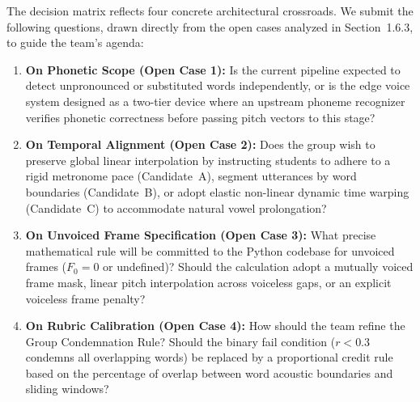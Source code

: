 \documentclass[11pt,a4paper]{article}
\begin{document}
The decision matrix reflects four concrete architectural crossroads. We submit the following questions, drawn directly from the open cases analyzed in Section~1.6.3, to guide the team's agenda:

\begin{enumerate}
    \item \textbf{On Phonetic Scope (Open Case 1):} Is the current pipeline expected to detect unpronounced or substituted words independently, or is the edge voice system designed as a two-tier device where an upstream phoneme recognizer verifies phonetic correctness before passing pitch vectors to this stage?
    \item \textbf{On Temporal Alignment (Open Case 2):} Does the group wish to preserve global linear interpolation by instructing students to adhere to a rigid metronome pace (Candidate~A), segment utterances by word boundaries (Candidate~B), or adopt elastic non-linear dynamic time warping (Candidate~C) to accommodate natural vowel prolongation?
    \item \textbf{On Unvoiced Frame Specification (Open Case 3):} What precise mathematical rule will be committed to the Python codebase for unvoiced frames ($F_0 = 0$ or undefined)? Should the calculation adopt a mutually voiced frame mask, linear pitch interpolation across voiceless gaps, or an explicit voiceless frame penalty?
    \item \textbf{On Rubric Calibration (Open Case 4):} How should the team refine the Group Condemnation Rule? Should the binary fail condition ($r < 0.3$ condemns all overlapping words) be replaced by a proportional credit rule based on the percentage of overlap between word acoustic boundaries and sliding windows?
\end{enumerate}
\end{document}

